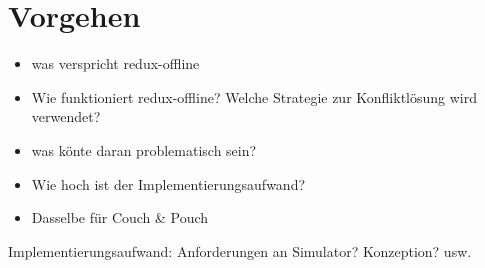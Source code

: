 \chapter{\label{chap:implementierung}Vorgehen}
\begin{itemize}
  \item was verspricht redux-offline
  \item Wie funktioniert redux-offline? Welche Strategie zur Konfliktlösung wird verwendet?
  \item was könte daran problematisch sein?
  \item Wie hoch ist der Implementierungsaufwand?
  \item Dasselbe für Couch \& Pouch
\end{itemize}

Implementierungsaufwand: Anforderungen an Simulator? Konzeption? usw.
